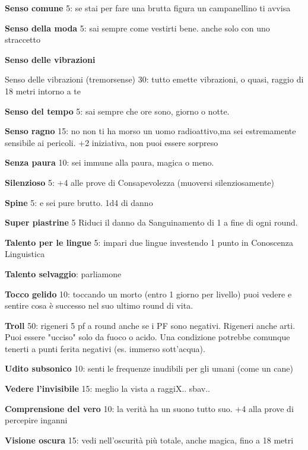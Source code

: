\documentclass[a4paper,11pt,twoside,openany]{book}
\begin{document}
\textbf{Senso comune} 5: se stai per fare una brutta figura un campanellino ti avvisa

\textbf{Senso della moda} 5: sai sempre come vestirti bene. anche solo con uno straccetto

\textbf{Senso delle vibrazioni} {Senso delle vibrazioni  (tremorsense) 30: tutto emette vibrazioni, o quasi, raggio di 18 metri intorno a te

\textbf{Senso del tempo} 5: sai sempre che ore sono, giorno o notte.

\textbf{Senso ragno} 15: no non ti ha morso un uomo radioattivo,ma sei estremamente sensibile ai pericoli. +2 iniziativa, non puoi essere sorpreso

\textbf{Senza paura} 10: sei immune alla paura, magica o meno.

\textbf{Silenzioso} 5: +4 alle prove di Consapevolezza (muoversi silenziosamente)

\textbf{Spine} 5: e sei pure brutto. 1d4 di danno

\textbf{Super piastrine} 5 Riduci il danno da Sanguinamento di 1 a fine di ogni round.

\textbf{Talento per le lingue} 5: impari due lingue investendo 1 punto in Conoscenza Linguistica

\textbf{Talento selvaggio}: parliamone

\textbf{Tocco gelido} 10: toccando un morto (entro 1 giorno per livello) puoi vedere e sentire cosa è successo nel suo ultimo round di vita.

\textbf{Troll} 50: rigeneri 5 pf a round anche se i PF sono negativi. Rigeneri anche arti. Puoi essere "ucciso" solo da fuoco o acido. Una condizione potrebbe comunque tenerti a punti ferita negativi (es. immerso sott'acqua).

\textbf{Udito subsonico} 10: senti le frequenze inudibili per gli umani (come un cane)

\textbf{Vedere l'invisibile} 15: meglio la vista a raggiX.. sbav..

\textbf{Comprensione del vero} 10: la verità ha un suono tutto suo. +4 alla prove di percepire inganni

\textbf{Visione oscura} 15: vedi nell'oscurità più totale, anche magica, fino a 18 metri

}
\end{document}
